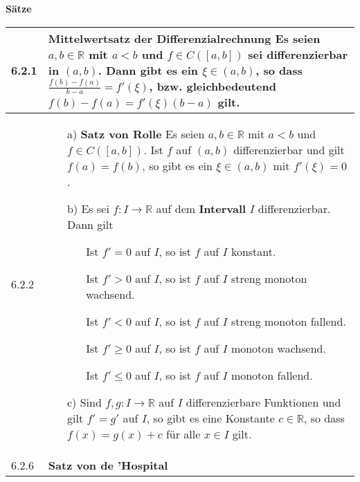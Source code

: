     \noindent 
    \textbf{Sätze}
    \begin{table}[H]
    \begin{tabularx}{\textwidth}{X m{16cm}}
        \toprule

        6.2.1 & \textbf{Mittelwertsatz der Differenzialrechnung} \hfill \break
                Es seien $a,b \in \mathbb{R}$ mit $a < b$ und $f \in C([a,b])$ sei differenzierbar in $(a,b)$. Dann gibt es ein
                $\xi \in (a,b)$, so dass $\frac{f(b)-f(a)}{b-a} = f'(\xi)$, bzw. gleichbedeutend $f(b) - f(a) = f'(\xi)(b-a)$ gilt. \\
        \midrule
        6.2.2 & \begin{itemize}
                    \item[a)] \textbf{Satz von Rolle} \hfill \break
                                Es seien $a, b \in \mathbb{R}$ mit $a < b$ und $f \in C([a,b])$. Ist $f$ auf $(a,b)$ differenzierbar
                                und gilt $f(a) = f(b)$, so gibt es ein $\xi \in (a,b)$ mit $f'(\xi) = 0$.
                    \item[b)] Es sei $f: I \rightarrow \mathbb{R}$ auf dem \textbf{Intervall} $I$ differenzierbar. Dann gilt
                                \begin{itemize}
                                    \item[] Ist $f' = 0$ auf $I$, so ist $f$ auf $I$ konstant.
                                    \item[] Ist $f' > 0$ auf $I$, so ist $f$ auf $I$ streng monoton wachsend.
                                    \item[] Ist $f' < 0$ auf $I$, so ist $f$ auf $I$ streng monoton fallend.
                                    \item[] Ist $f' \geq 0$ auf $I$, so ist $f$ auf $I$ monoton wachsend.
                                    \item[] Ist $f' \leq 0$ auf $I$, so ist $f$ auf $I$ monoton fallend.
                                \end{itemize} 
                    \item[c)] Sind $f,g : I \rightarrow \mathbb{R}$ auf $I$ differenzierbare Funktionen und gilt $f' = g'$ auf $I$,
                                so gibt es eine Konstante $c \in \mathbb{R}$, so dass $f(x) = g(x) + c$ für alle $x \in I$ gilt.
                \end{itemize} \\
        \midrule
        6.2.6 & \textbf{Satz von de 'Hospital} \hfill \break

\end{tabularx}
\end{table}
